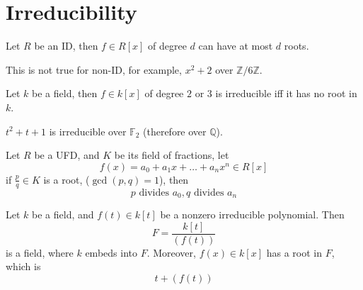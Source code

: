 \documentclass[openany]{book}
\newcommand{\Z}{\mathbb{Z}}
\newcommand{\F}{\mathbb{F}}
\newcommand{\Q}{\mathbb{Q}}
\begin{document}








\section{Irreducibility}
\begin{prop}
    Let $R$ be an ID, then $f\in R[x]$ of degree $d$ can have at most $d$ roots.
\end{prop}
This is not true for non-ID, for example, $x^2+2$ over $\Z/6\Z$.

\begin{prop}
    Let $k$ be a field, then $f\in k[x]$ of degree $2$ or $3$ is irreducible iff it has no root in $k$.
\end{prop}
\begin{example}
    $t^2+t+1$ is irreducible over $\F_2$ (therefore over $\Q$).
\end{example}

\begin{prop}
    Let $R$ be a UFD, and $K$ be its field of fractions, let 
    \begin{equation*}
        f(x)=a_0+a_1x+\dots+a_nx^n\in R[x]
    \end{equation*}
    if $\frac{p}{q}\in K$ is a root, ($\gcd(p,q)=1$), then 
    \begin{equation*}
        p\text{ divides } a_0, q\text{ divides } a_n
    \end{equation*}
\end{prop}

\begin{prop}
    Let $k$ be a field, and $f(t)\in k[t]$ be a nonzero irreducible polynomial. Then 
    \begin{equation*}
        F=\frac{k[t]}{(f(t))}
    \end{equation*}
    is a field, where $k$ embeds into $F$. Moreover, $f(x)\in k[x]$ has a root in $F$, which is 
    \begin{equation*}
        t+(f(t))
    \end{equation*}
\end{prop}
\end{document}
